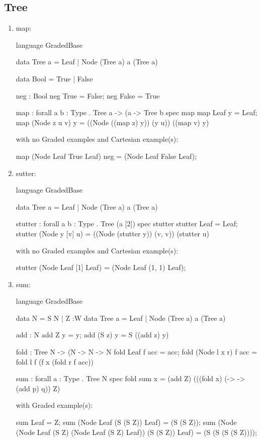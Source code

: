 \subsection{Tree}
\begin{enumerate}
\item map: 
\begin{granule}
language GradedBase

data Tree a = Leaf | Node (Tree a) a (Tree a)

data Bool = True | False

neg : Bool %
neg True = False; 
neg False = True

map : forall { a b : Type }
    . Tree a %
    -> (a %
    -> Tree b
spec
    map %
map Leaf y = Leaf;
map (Node z u v) y = ((Node ((map z) y)) (y u)) ((map v) y)
\end{granule}
with no Graded examples and Cartesian example(s):
\begin{granule}
map (Node Leaf True Leaf) neg = (Node Leaf False Leaf);
\end{granule}
\item sutter: 
\begin{granule}
language GradedBase

data Tree a = Leaf | Node (Tree a) a (Tree a)

stutter : forall { a b : Type } . Tree (a [2]) %
spec
    stutter %
stutter Leaf = Leaf;
stutter (Node y [v] u) = ((Node (stutter y)) (v, v)) (stutter u)
\end{granule}
with no Graded examples and Cartesian example(s):
\begin{granule}
stutter (Node Leaf [1] Leaf) = (Node Leaf (1, 1) Leaf);
\end{granule}
\item sum: 
\begin{granule}
language GradedBase

data N = S N | Z
:W
data Tree a = Leaf | Node (Tree a) a (Tree a)

add : N %
add Z y = y;
add (S z) y = S ((add z) y)

fold : Tree N %
     -> (N %
     -> N %
     -> N 
fold Leaf f acc = acc;
fold (Node l x r) f acc = 
    fold l f (f x (fold r f acc))

sum : forall { a : Type } . Tree N %
spec 
    fold %
sum x = (add Z) (((fold x) (\p -> \q -> (add p) q)) Z)
\end{granule}
with Graded example(s):
\begin{granule}
sum Leaf = Z;
sum (Node Leaf (S (S Z)) Leaf) = (S (S Z));
sum (Node (Node Leaf (S Z) (Node Leaf (S Z) Leaf)) (S (S Z)) Leaf) = (S (S (S (S Z))));
\end{granule}
\end{enumerate}
